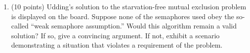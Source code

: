 \documentclass[12pt]{article}
\begin{document}
\begin{enumerate}
\item (10 points)
Udding's solution to the starvation-free mutual exclusion problem is
displayed on the board.  Suppose none of the semaphores used obey the
so-called ``weak semaphore assumption.''  Would this algorithm remain
a valid solution?  If so, give a convincing argument.  If not, exhibit
a scenario demonstrating a situation that violates a requirement of
the problem.
\end{enumerate}
\end{document}
